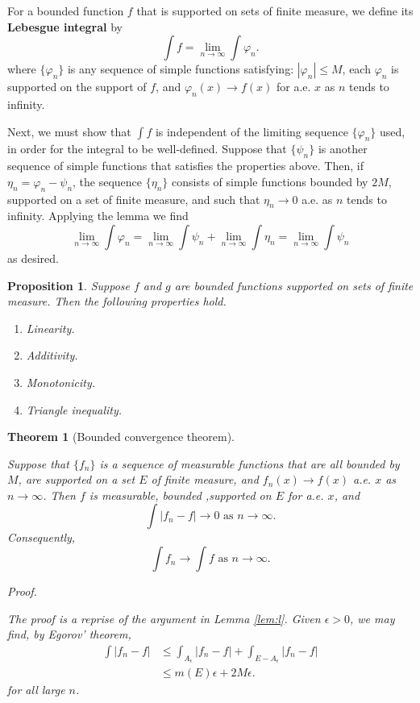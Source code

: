 \documentclass[
]{book}
\providecommand{\tightlist}{%
  \setlength{\itemsep}{0pt}\setlength{\parskip}{0pt}}
\newtheorem{theorem}{Theorem}[chapter]
\newtheorem{proposition}{Proposition}[chapter]
\theoremstyle{definition}
\theoremstyle{definition}
\theoremstyle{definition}
\theoremstyle{definition}
\theoremstyle{remark}
\begin{document}
For a bounded function \(f\) that is supported on sets of finite measure, we define its \textbf{Lebesgue integral} by
\[
\int f=\lim_{n\to\infty}\int\varphi_n.
\]
where \(\{\varphi_n\}\) is any sequence of simple functions satisfying: \(|\varphi_n|\le M\), each \(\varphi_n\) is supported on the support of \(f\), and \(\varphi_n(x)\to f(x)\) for a.e. \(x\) as \(n\) tends to infinity.

Next, we must show that \(\int f\) is independent of the limiting sequence \(\{\varphi_n\}\) used, in order for the integral to be well-defined. Suppose that \(\{\psi_n\}\) is another sequence of simple functions that satisfies the properties above. Then, if \(\eta_n = \varphi_n- \psi_n\), the sequence \(\{\eta_n\}\) consists of simple functions bounded by \(2M\), supported on a set of finite measure, and such that \(\eta_n\to 0\) a.e. as \(n\) tends to infinity. Applying the lemma we find
\[
\lim_{n\to\infty}\int \varphi_n =\lim_{n\to\infty}\int \psi_n+\lim_{n\to\infty}\int \eta_n=\lim_{n\to\infty}\int \psi_n
\]
as desired.

\begin{proposition}

Suppose \(f\) and \(g\) are bounded functions supported on sets of finite measure. Then the following properties hold.

\begin{enumerate}
\def\labelenumi{\arabic{enumi}.}
\tightlist
\item
  Linearity.
\item
  Additivity.
\item
  Monotonicity.
\item
  Triangle inequality.
\end{enumerate}

\end{proposition}

\begin{theorem}[Bounded convergence theorem]
\protect\hypertarget{thm:b}{}\label{thm:b}\leavevmode

Suppose that \(\{f_n\}\) is a sequence of measurable functions that are all bounded by \(M\), are supported on a set \(E\) of finite measure, and \(f_n(x)\to f(x)\) a.e. \(x\) as \(n\to\infty\). Then \(f\) is measurable, bounded ,supported on \(E\) for a.e. \(x\), and
\[
\int|f_n-f|\to 0 \text{ as } n\to\infty.
\]
Consequently,
\[
\int f_n\to \int f  \text{ as } n\to\infty.
\]

\emph{Proof.}

The proof is a reprise of the argument in Lemma \ref{lem:l}. Given \(\epsilon>0\), we may find, by Egorov' theorem,
\[
\begin{aligned}
\int|f_n-f| &\le \int_{A_\epsilon}|f_n-f|+\int_{E-A_\epsilon}|f_n-f|\\
&\le m(E)\epsilon+2M\epsilon.
\end{aligned}
\]
for all large \(n\).

\end{theorem}
\end{document}

